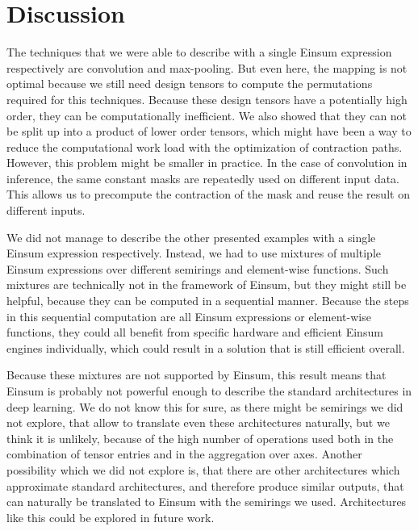 \section{Discussion}

The techniques that we were able to describe with a single Einsum expression respectively are convolution and max-pooling.
But even here, the mapping is not optimal because we still need design tensors to compute the permutations required for this techniques.
Because these design tensors have a potentially high order, they can be computationally inefficient.
We also showed that they can not be split up into a product of lower order tensors, which might have been a way to reduce the computational work load with the optimization of contraction paths.
However, this problem might be smaller in practice.
In the case of convolution in inference, the same constant masks are repeatedly used on different input data.
This allows us to precompute the contraction of the mask and reuse the result on different inputs.

We did not manage to describe the other presented examples with a single Einsum expression respectively.
Instead, we had to use mixtures of multiple Einsum expressions over different semirings and element-wise functions.
Such mixtures are technically not in the framework of Einsum, but they might still be helpful,
because they can be computed in a sequential manner.
Because the steps in this sequential computation are all Einsum expressions or element-wise functions,
they could all benefit from specific hardware and efficient Einsum engines individually,
which could result in a solution that is still efficient overall.

Because these mixtures are not supported by Einsum, this result means that Einsum is probably not powerful enough to describe the standard architectures in deep learning.
We do not know this for sure, as there might be semirings we did not explore, that allow to translate even these architectures naturally,
but we think it is unlikely, because of the high number of operations used both in the combination of tensor entries and in the aggregation over axes.
Another possibility which we did not explore is, that there are other architectures which approximate standard architectures, and therefore produce similar outputs, that can naturally be translated to Einsum with the semirings we used.
Architectures like this could be explored in future work.
